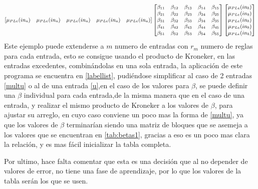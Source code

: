     \begin{equation}
     \small{
    \begin{bmatrix}
    \mu_{PLe}(in_a) & \mu_{PLe}(in_a) & \mu_{PLe}(in_a) & \mu_{PLe}(in_a) & \mu_{PLe}(in_a)
    \end{bmatrix} } \begin{bmatrix}
   \beta_{11} &\beta_{12}  &\beta_{13}  &\beta_{14}  &\beta_{15}  \\ 
   \beta_{21} & \beta_{22} & \beta_{23} & \beta_{24} & \beta_{25} \\ 
   \beta_{31} &\beta_{32}  &\beta_{33}  &\beta_{34}  &\beta_{35}\\
   \beta_{41} &\beta_{42}  &\beta_{43}  &\beta_{44}  &\beta_{45}\\
   \beta_{51} &\beta_{52}  &\beta_{53}  &\beta_{54}  &\beta_{55}    \end{bmatrix}    \begin{bmatrix}
   \mu_{PLe}(in_b) \\ 
    \mu_{PLe}(in_b)\\ 
    \mu_{PLe}(in_b)\\ 
    \mu_{PLe}(in_b)\\ 
    \mu_{PLe}(in_b)
    \end{bmatrix}
    \end{equation}
    Este ejemplo puede extenderse a $m$ numero de entradas con $r_m$ numero de reglas para cada entrada, esto se consigue usando el producto de Kroneker,  en las entradas excedentes, combinándolas en una sola entrada, la aplicación de este programa se encuentra en \cref{labellist}, pudiéndose simplificar al caso de 2 entradas \ref{multu} o al de una entrada \ref{u},en el caso de los valores para $\beta$, se puede definir una $\beta$ individual para cada entrada,de la misma manera que en el caso de una entrada, y realizar el mismo producto de Kroneker a los valores de $\beta$, para ajustar su arreglo, en cuyo caso conviene un poco mas la forma de \cref{multu}, ya que los valores de $\beta$ terminarían siendo una matriz de bloques que se asemeja a los valores que se encuentran en \cref{tab:betas1}, gracias a eso es un poco mas clara la relación, y es mas fácil inicializar la tabla completa.
    
    Por ultimo, hace falta comentar que esta es una decisión que al no depender de valores de error, no tiene una fase de aprendizaje, por lo que los valores de la tabla serán los que se usen.
   
    
    
    
    
